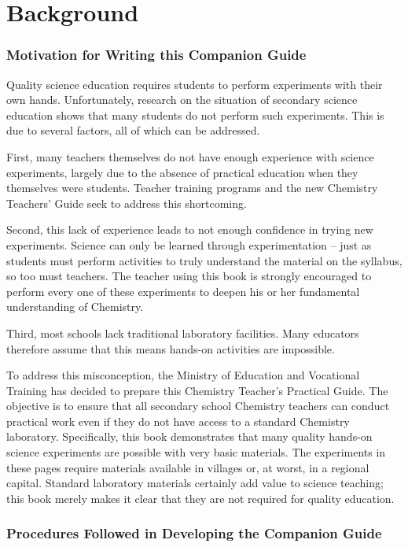 \chapter*{Background}

\subsection*{Motivation for Writing this Companion Guide}

Quality science education requires students to perform experiments with their own hands. Unfortunately, research on the situation of secondary science education shows that many students do not perform such experiments. This is due to several factors, all of which can be addressed.

First, many teachers themselves do not have enough experience with science experiments, largely due to the absence of practical education when they themselves were students. Teacher training programs and the new Chemistry Teachers' Guide seek to address this shortcoming.

Second, this lack of experience leads to not enough confidence in trying new experiments. Science can only be learned through experimentation -- just as students must perform activities to truly understand the material on the syllabus, so too must teachers. The teacher using this book is strongly encouraged to perform every one of these experiments to deepen his or her fundamental understanding of Chemistry.

Third, most schools lack traditional laboratory facilities. Many educators therefore assume that this means hands-on activities are impossible.

To address this misconception, the Ministry of Education and Vocational Training has decided to prepare this Chemistry Teacher's Practical Guide. The objective is to ensure that all secondary school Chemistry teachers can conduct practical work even if they do not have access to a standard Chemistry laboratory. Specifically, this book demonstrates that many quality hands-on science experiments are possible with very basic materials. The experiments in these pages require materials available in villages or, at worst, in a regional capital. Standard laboratory materials certainly add value to science teaching; this book merely makes it clear that they are not required for quality education.

\subsection*{Procedures Followed in Developing the Companion Guide}

